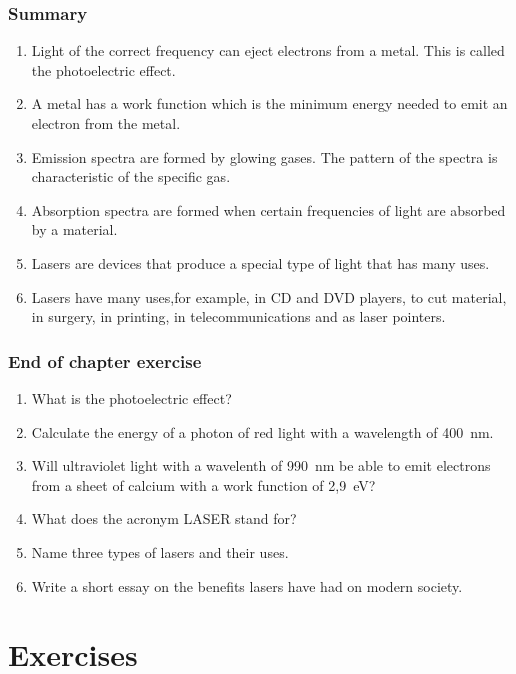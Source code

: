 \section{Summary}
\begin{enumerate}
\item Light of the correct frequency can eject electrons from a metal. This is called the photoelectric effect.
\item A metal has a work function which is the minimum energy needed to emit an electron from the metal. 
\item Emission spectra are formed by glowing gases. The pattern of the spectra is characteristic of the specific gas. 
\item Absorption spectra are formed when certain frequencies of light are absorbed by a material.
\item Lasers are devices that produce a special type of light that has many uses.
\item Lasers have many uses,for example, in CD and DVD players, to cut material, in surgery, in printing, in telecommunications and as laser pointers.
\end{enumerate}
\section{End of chapter exercise}
\begin{enumerate}
\item What is the photoelectric effect? 
\item Calculate the energy of a photon of red light with a wavelength of 400~nm.
\item Will ultraviolet light with a wavelenth of 990~nm be able to emit electrons from a sheet of calcium with a work function of 2,9~eV?
\item What does the acronym LASER stand for?
\item Name three types of lasers and their uses.
\item Write a short essay on the benefits lasers have had on modern society.
\end{enumerate}









\part{Exercises}
